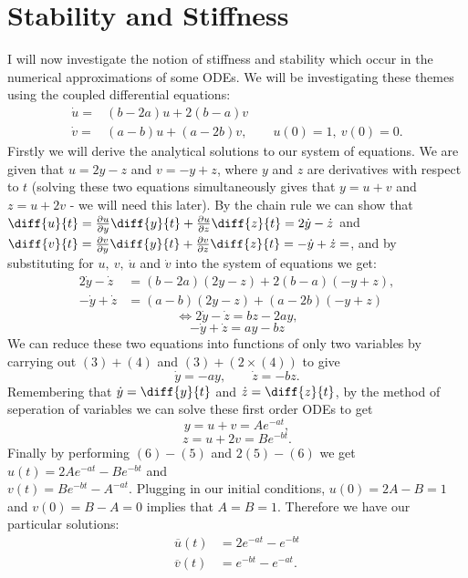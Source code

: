 \documentclass[11pt,a4paper]{article}
\begin{document}
\section*{Stability and Stiffness}
I will now investigate the notion of stiffness and stability which occur in the numerical approximations of some ODEs. We will be investigating these themes using the coupled differential equations: \begin{align*}\dot{u}=&(b-2a)u+2(b-a)v\\
\dot{v}=&(a-b)u+(a-2b)v, \qquad u(0)=1,\ v(0)=0.
\end{align*}
Firstly we will derive the analytical solutions to our system of equations. We are given that $u=2y-z$ and $v=-y+z$, where $y$ and $z$ are derivatives with respect to $t$ (solving these two equations simultaneously gives that $y=u+v$ and $z=u+2v$ - we will need this later). By the chain rule we can show that $\diff{u}{t}=\frac{\partial u}{\partial y}\diff{y}{t}+ \frac{\partial u}{\partial z}\diff{z}{t}=2\dot{y}-\dot{z}$ and \\$\diff{v}{t}=\frac{\partial v}{\partial y}\diff{y}{t}+\frac{\partial v}{\partial z}\diff{z}{t}=-\dot{y}+\dot{z}=$, and by substituting for $u,\ v,\ \dot{u}$ and $\dot{v}$ into the system of equations we get:
\begin{align*}
2\dot{y}-\dot{z}&=(b-2a)(2y-z)+2(b-a)(-y+z),\\
-\dot{y}+\dot{z}&=(a-b)(2y-z)+(a-2b)(-y+z) \end{align*}
\begin{equation}\iff 2\dot{y}-\dot{z}=bz-2ay, \end{equation}
\begin{equation}-\dot{y}+\dot{z}=ay-bz \end{equation}
We can reduce these two equations into functions of only two variables by carrying out $(3)+(4)$ and $(3)+(2\times (4))$ to give
$$\dot{y}=-ay, \qquad \dot{z}=-bz.$$
Remembering that $\dot{y}=\diff{y}{t}$ and $\dot{z}=\diff{z}{t}$, by the method of seperation of variables we can solve these first order ODEs to get 
\begin{equation}y=u+v=Ae^{-at},\end{equation}
\begin{equation}z=u+2v=Be^{-bt}.\end{equation}
Finally by performing $(6)-(5)$ and $2(5)-(6)$ we get $u(t)=2Ae^{-at}-Be^{-bt}$ and \\$v(t)=Be^{-bt}-A^{-at}.$ 
Plugging in our initial conditions, $u(0)=2A-B=1$ and $v(0)=B-A=0$ implies that $A=B=1$. Therefore we have our particular solutions:
\begin{align*}
\overline{u}(t)&=2e^{-at}-e^{-bt}\\
\overline{v}(t)&=e^{-bt}-e^{-at}.
\end{align*}
\end{document}
